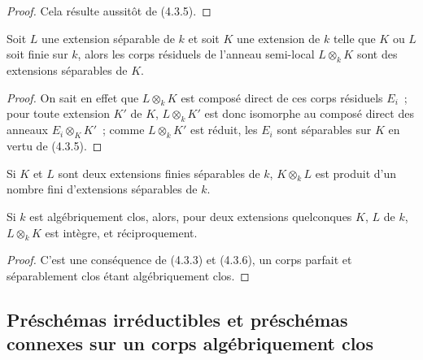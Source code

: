 \begin{proof}
Cela résulte aussitôt de (4.3.5).
\end{proof}

\begin{corollary}[4.3.7]
\label{IV.2.4.3.7-fr}
Soit $L$ une extension séparable de $k$ et soit $K$ une extension de $k$ telle
que $K$ ou $L$ soit finie sur $k$, alors les corps résiduels de l'anneau
semi-local $L\otimes_k K$ sont des extensions séparables de $K$.
\end{corollary}

\begin{proof}
On sait en effet que $L\otimes_k K$ est composé direct de ces corps résiduels
$E_i$~; pour toute extension $K'$ de $K$, $L\otimes_k K'$ est donc isomorphe
au composé direct des anneaux $E_i\otimes_K K'$~; comme $L\otimes_k K'$ est
réduit, les $E_i$ sont séparables sur $K$ en vertu de (4.3.5).
\end{proof}

\begin{corollary}[4.3.8]
\label{IV.2.4.3.8-fr}
Si $K$ et $L$ sont deux extensions finies séparables de $k$, $K\otimes_k L$
est produit d'un nombre fini d'extensions séparables de $k$.
\end{corollary}


\begin{proposition}[4.3.9]
\label{IV.2.4.3.9-fr}
Si $k$ est algébriquement clos, alors, pour deux extensions quelconques $K$,
$L$ de $k$, $L\otimes_k K$ est intègre, et réciproquement.
\end{proposition}

\begin{proof}
C'est une conséquence de (4.3.3) et (4.3.6), un corps parfait et séparablement
clos étant algébriquement clos.
\end{proof}

\subsection{Préschémas irréductibles et préschémas connexes sur un corps
algébriquement clos}
\label{subsection:IV.2.4.4-fr}

